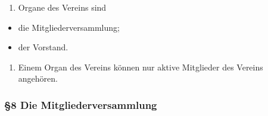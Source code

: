 \documentclass[german]{article}
\providecommand{\tightlist}{%
	\setlength{\itemsep}{0pt}\setlength{\parskip}{0pt}}
\begin{document}
\begin{enumerate}
\def\labelenumi{\arabic{enumi}.}
\tightlist
\item
  Organe des Vereins sind
\end{enumerate}

\begin{itemize}
\tightlist
\item
  die Mitgliederversammlung;
\item
  der Vorstand.
\end{itemize}

\begin{enumerate}
\def\labelenumi{\arabic{enumi}.}
\setcounter{enumi}{1}
\tightlist
\item
  Einem Organ des Vereins können nur aktive Mitglieder des Vereins
  angehören.
\end{enumerate}

\subsubsection*{§8 Die
Mitgliederversammlung}\label{die-mitgliederversammlung}
\end{document}
